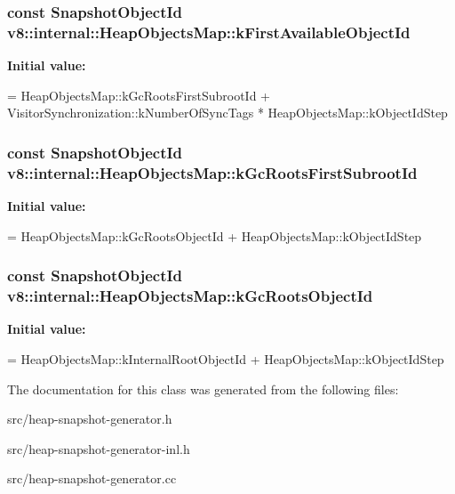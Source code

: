 \subsubsection[{k\+First\+Available\+Object\+Id}]{\setlength{\rightskip}{0pt plus 5cm}const Snapshot\+Object\+Id v8\+::internal\+::\+Heap\+Objects\+Map\+::k\+First\+Available\+Object\+Id\hspace{0.3cm}{\ttfamily [static]}}\label{classv8_1_1internal_1_1_heap_objects_map_a0424e15b8207599ea3fae3c69eb0fa26}
{\bfseries Initial value\+:}
\begin{DoxyCode}
=
    HeapObjectsMap::kGcRootsFirstSubrootId +
    VisitorSynchronization::kNumberOfSyncTags * HeapObjectsMap::kObjectIdStep
\end{DoxyCode}
\hypertarget{classv8_1_1internal_1_1_heap_objects_map_a1328bc87783492d376630e24758bbc69}{}
\subsubsection[{k\+Gc\+Roots\+First\+Subroot\+Id}]{\setlength{\rightskip}{0pt plus 5cm}const Snapshot\+Object\+Id v8\+::internal\+::\+Heap\+Objects\+Map\+::k\+Gc\+Roots\+First\+Subroot\+Id\hspace{0.3cm}{\ttfamily [static]}}\label{classv8_1_1internal_1_1_heap_objects_map_a1328bc87783492d376630e24758bbc69}
{\bfseries Initial value\+:}
\begin{DoxyCode}
=
    HeapObjectsMap::kGcRootsObjectId + HeapObjectsMap::kObjectIdStep
\end{DoxyCode}
\hypertarget{classv8_1_1internal_1_1_heap_objects_map_abf649a7b9e771c6b8dbe9ef581d5eaac}{}
\subsubsection[{k\+Gc\+Roots\+Object\+Id}]{\setlength{\rightskip}{0pt plus 5cm}const Snapshot\+Object\+Id v8\+::internal\+::\+Heap\+Objects\+Map\+::k\+Gc\+Roots\+Object\+Id\hspace{0.3cm}{\ttfamily [static]}}\label{classv8_1_1internal_1_1_heap_objects_map_abf649a7b9e771c6b8dbe9ef581d5eaac}
{\bfseries Initial value\+:}
\begin{DoxyCode}
=
    HeapObjectsMap::kInternalRootObjectId + HeapObjectsMap::kObjectIdStep
\end{DoxyCode}


The documentation for this class was generated from the following files\+:\begin{DoxyCompactItemize}
\item 
src/heap-\/snapshot-\/generator.\+h\item 
src/heap-\/snapshot-\/generator-\/inl.\+h\item 
src/heap-\/snapshot-\/generator.\+cc\end{DoxyCompactItemize}
